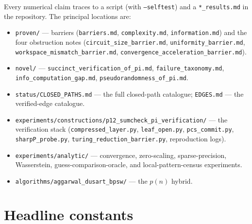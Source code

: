 \documentclass[11pt]{article}
\theoremstyle{plain}
\theoremstyle{definition}
\theoremstyle{remark}
\begin{document}
Every numerical claim traces to a script (with \texttt{--selftest}) and a
\texttt{*\_results.md} in the repository. The principal locations are:
\begingroup\sloppy
\begin{itemize}[leftmargin=1.4em,itemsep=1pt]
\item \texttt{proven/} --- barriers (\texttt{barriers.md}, \texttt{complexity.md},
\texttt{information.md}) and the four obstruction notes
(\texttt{circuit\_size\_barrier.md}, \texttt{uniformity\_barrier.md},
\texttt{workspace\_mismatch\_barrier.md}, \texttt{convergence\_acceleration\_barrier.md}).
\item \texttt{novel/} --- \texttt{succinct\_verification\_of\_pi.md},
\texttt{failure\_taxonomy.md}, \texttt{info\_computation\_gap.md},
\texttt{pseudorandomness\_of\_pi.md}.
\item \texttt{status/CLOSED\_PATHS.md} --- the full closed-path catalogue;
\texttt{EDGES.md} --- the verified-edge catalogue.
\item \texttt{experiments/\allowbreak constructions/\allowbreak p12\_\allowbreak sumcheck\_\allowbreak pi\_\allowbreak verification/} --- the
verification stack (\texttt{compressed\_layer.py}, \texttt{leaf\_open.py},
\texttt{pcs\_commit.py}, \texttt{sharpP\_probe.py},
\texttt{turing\_reduction\_barrier.py}, reproduction logs).
\item \texttt{experiments/analytic/} --- convergence, zero-scaling,
sparse-precision, Wasserstein, guess-comparison-oracle, and local-pattern-census
experiments.
\item \texttt{algorithms/aggarwal\_dusart\_bpsw/} --- the $p(n)$ hybrid.
\end{itemize}
\endgroup

\section{Headline constants}
\label{app:constants}
\end{document}
